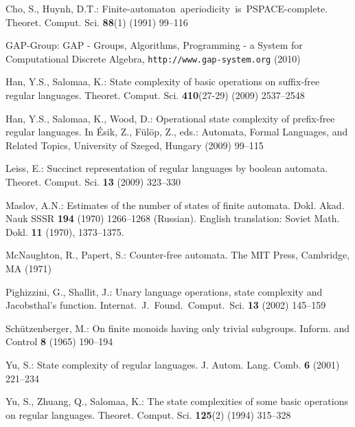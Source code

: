 \documentclass{llncs}
\begin{document}
\begin{thebibliography}{10}
Cho, S., Huynh, D.T.:
\newblock \mbox{Finite-automaton aperiodicity is PSPACE-complete}.
\newblock Theoret. Comput. Sci. \textbf{88}(1) (1991)  99--116

GAP-Group:
\newblock GAP - Groups, Algorithms, Programming - a System for Computational
  Discrete Algebra, {\tt http://www.gap-system.org} (2010)

Han, Y.S., Salomaa, K.:
\newblock State complexity of basic operations on suffix-free regular
  languages.
\newblock Theoret. Comput. Sci. \textbf{410}(27-29) (2009)  2537--2548

Han, Y.S., Salomaa, K., Wood, D.:
\newblock Operational state complexity of prefix-free regular languages.
\newblock In {\'E}sik, Z., F{\"u}l{\"o}p, Z., eds.: Automata, Formal Languages,
  and Related Topics, University of Szeged, Hungary (2009)  99--115

Leiss, E.:
\newblock Succinct representation of regular languages by boolean automata.
\newblock Theoret. Comput. Sci. \textbf{13} (2009)  323--330

Maslov, A.N.:
\newblock Estimates of the number of states of finite automata.
\newblock Dokl. Akad. Nauk SSSR \textbf{194} (1970)  1266--1268 (Russian).
  English translation: Soviet Math. Dokl. {\bf 11} (1970), 1373--1375.

McNaughton, R., Papert, S.:
\newblock Counter-free automata.
\newblock The MIT Press, Cambridge, MA (1971)

Pighizzini, G., Shallit, J.:
\newblock Unary language operations, state complexity and \mbox{Jacobsthal's}
  function.
\newblock Internat.\ J.\ Found.\ Comput.\ Sci. \textbf{13} (2002)  145--159

Sch\"utzenberger, M.:
\newblock On finite monoids having only trivial subgroups.
\newblock Inform. and Control \textbf{8} (1965)  190--194

Yu, S.:
\newblock State complexity of regular languages.
\newblock J. Autom. Lang. Comb. \textbf{6} (2001)  221--234

Yu, S., Zhuang, Q., Salomaa, K.:
\newblock The state complexities of some basic operations on regular languages.
\newblock Theoret. Comput. Sci. \textbf{125}(2) (1994)  315--328

\end{thebibliography}
\end{document}
